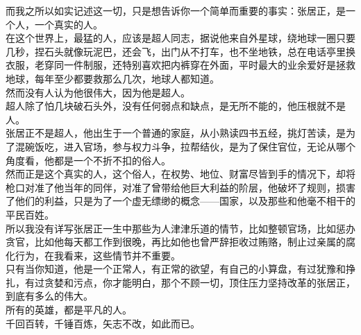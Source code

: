 \begin{multicols}{\theparacolNo}
而我之所以如实记述这一切，只是想告诉你一个简单而重要的事实：张居正，是一个人，一个真实的人。\\

在这个世界上，最猛的人，应该是超人同志，据说他来自外星球，绕地球一圈只要几秒，捏石头就像玩泥巴，还会飞，出门从不打车，也不坐地铁，总在电话亭里换衣服，老穿同一件制服，还特别喜欢把内裤穿在外面，平时最大的业余爱好是拯救地球，每年至少都要救那么几次，地球人都知道。\\

然而没有人认为他很伟大，因为他是超人。\\

超人除了怕几块破石头外，没有任何弱点和缺点，是无所不能的，他压根就不是人。\\

张居正不是超人，他出生于一个普通的家庭，从小熟读四书五经，挑灯苦读，是为了混碗饭吃，进入官场，参与权力斗争，拉帮结伙，是为了保住官位，无论从哪个角度看，他都是一个不折不扣的俗人。\\

然而正是这个真实的人，这个俗人，在权势、地位、财富尽皆到手的情况下，却将枪口对准了他当年的同伴，对准了曾带给他巨大利益的阶层，他破坏了规则，损害了他们的利益，只是为了一个虚无缥缈的概念——国家，以及那些和他毫不相干的平民百姓。\\

所以我没有详写张居正一生中那些为人津津乐道的情节，比如整顿官场，比如惩办贪官，比如他每天都工作到很晚，再比如他也曾严辞拒收过贿赂，制止过亲属的腐化行为，在我看来，这些情节并不重要。\\

只有当你知道，他是一个正常人，有正常的欲望，有自己的小算盘，有过犹豫和挣扎，有过贪婪和污点，你才能明白，那个不顾一切，顶住压力坚持改革的张居正，到底有多么的伟大。\\

所有的英雄，都是平凡的人。\\

千回百转，千锤百炼，矢志不改，如此而已。\\
\ifnum{}
	\end{multicols}
\fi
\newpage

